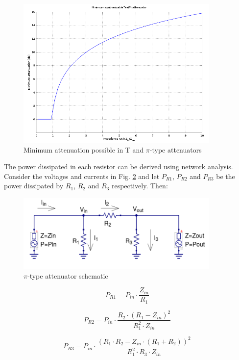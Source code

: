   \begin{figure}[H]
    \centering
    \includegraphics[width=10cm]{./images/pi-tee-minimum-attenuation-vs-Zin-Zout.png}
    \caption{Minimum attenuation possible in T and $\pi$-type attenuators}
    \label{fig:tee-type-minimum-attenuation}
  \end{figure}  

\noindent The power dissipated in each resistor can be derived using network analysis. Consider the voltages and currents in Fig. \ref{fig:power-dissipation-pi-type-attenuator} and let $P_{R1}$, $P_{R2}$ and $P_{R3}$ be the power dissipated by $R_1$, $R_2$ and $R_3$ respectively. Then: 

  \begin{figure}[H]
    \centering
    \includegraphics[width=10cm]{./images/pi-attenuator-power-dissipation.png}
    \caption{$\pi$-type attenuator schematic}
    \label{fig:power-dissipation-pi-type-attenuator}
  \end{figure}
  
  \begin{equation}
  	P_{R1} = P_{in} \cdot \frac{Z_{in}}{R_1}
  \end{equation}
  
  \begin{equation}
  	P_{R2} = P_{in} \cdot  \frac{R_2 \cdot (R_1 - Z_{in})^2}{R_1^2 \cdot Z_{in}}
  \end{equation}
   
  \begin{equation}
  	P_{R3} = P_{in} \cdot \frac{\left( R_1 \cdot R_2 - Z_{in} \cdot (R_1 + R_2) \right)^2}{R_1^2 \cdot R_3 \cdot Z_{in}}
  \end{equation}